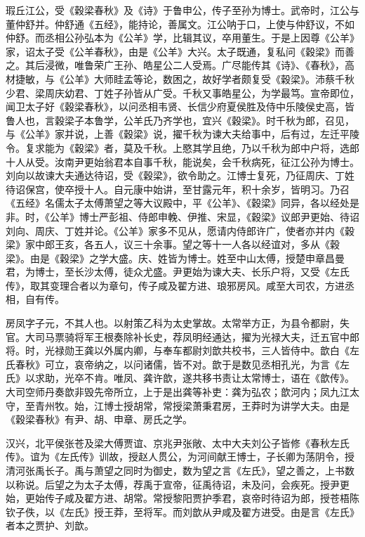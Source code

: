 \documentclass[12pt,UTF8]{ctexbook}
\begin{document}
瑕丘江公，受《穀梁春秋》及《诗》于鲁申公，传子至孙为博士。武帝时，江公与董仲舒并。仲舒通《五经》，能持论，善属文。江公呐于口，上使与仲舒议，不如仲舒。而丞相公孙弘本为《公羊》学，比辑其议，卒用董生。于是上因尊《公羊》家，诏太子受《公羊春秋》，由是《公羊》大兴。太子既通，复私问《穀梁》而善之。其后浸微，唯鲁荣广王孙、皓星公二人受焉。广尽能传其《诗》、《春秋》，高材捷敏，与《公羊》大师眭孟等论，数困之，故好学者颇复受《穀梁》。沛蔡千秋少君、梁周庆幼君、丁姓子孙皆从广受。千秋又事皓星公，为学最笃。宣帝即位，闻卫太子好《穀梁春秋》，以问丞相韦贤、长信少府夏侯胜及侍中乐陵侯史高，皆鲁人也，言穀梁子本鲁学，公羊氏乃齐学也，宜兴《穀梁》。时千秋为郎，召见，与《公羊》家并说，上善《穀梁》说，擢千秋为谏大夫给事中，后有过，左迁平陵令。复求能为《穀梁》者，莫及千秋。上愍其学且绝，乃以千秋为郎中户将，选郎十人从受。汝南尹更始翁君本自事千秋，能说矣，会千秋病死，征江公孙为博士。刘向以故谏大夫通达待诏，受《穀梁》，欲令助之。江博士复死，乃征周庆、丁姓待诏保宫，使卒授十人。自元康中始讲，至甘露元年，积十余岁，皆明习。乃召《五经》名儒太子太傅萧望之等大议殿中，平《公羊》、《穀梁》同异，各以经处是非。时，《公羊》博士严彭祖、侍郎申輓、伊推、宋显，《穀梁》议郎尹更始、待诏刘向、周庆、丁姓并论。《公羊》家多不见从，愿请内侍郎许广，使者亦并内《穀梁》家中郎王亥，各五人，议三十余事。望之等十一人各以经谊对，多从《穀梁》。由是《穀梁》之学大盛。庆、姓皆为博士。姓至中山太傅，授楚申章昌曼君，为博士，至长沙太傅，徒众尤盛。尹更始为谏大夫、长乐户将，又受《左氏传》，取其变理合者以为章句，传子咸及翟方进、琅邪房风。咸至大司农，方进丞相，自有传。



房凤字子元，不其人也。以射策乙科为太史掌故。太常举方正，为县令都尉，失官。大司马票骑将军王根奏除补长史，荐凤明经通达，擢为光禄大夫，迁五官中郎将。时，光禄勋王龚以外属内卿，与奉车都尉刘歆共校书，三人皆侍中。歆白《左氏春秋》可立，哀帝纳之，以问诸儒，皆不对。歆于是数见丞相孔光，为言《左氏》以求助，光卒不肯。唯凤、龚许歆，遂共移书责让太常博士，语在《歆传》。大司空师丹奏歆非毁先帝所立，上于是出龚等补吏：龚为弘农；歆河内；凤九江太守，至青州牧。始，江博士授胡常，常授梁萧秉君房，王莽时为讲学大夫。由是《穀梁春秋》有尹、胡、申章、房氏之学。



汉兴，北平侯张苍及梁大傅贾谊、京兆尹张敞、太中大夫刘公子皆修《春秋左氏传》。谊为《左氏传》训故，授赵人贯公，为河间献王博士，子长卿为荡阴令，授清河张禹长子。禹与萧望之同时为御史，数为望之言《左氏》，望之善之，上书数以称说。后望之为太子太傅，荐禹于宣帝，征禹待诏，未及问，会疾死。授尹更始，更始传子咸及翟方进、胡常。常授黎阳贾护季君，哀帝时待诏为郎，授苍梧陈钦子佚，以《左氏》授王莽，至将军。而刘歆从尹咸及翟方进受。由是言《左氏》者本之贾护、刘歆。
\end{document}
